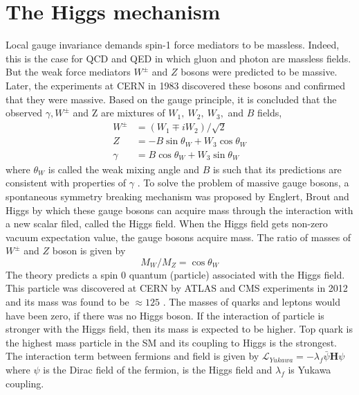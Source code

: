 \section{The Higgs mechanism}\label{sec:higgsMech}
Local gauge invariance demands spin-1 force mediators to be massless. Indeed, this is the case for QCD and QED in which gluon and photon 
are massless fields. But the weak force mediators $W^\pm$ and $Z$ bosons were predicted to be massive. Later, the experiments at CERN in 1983 
\cite{ARNISON1983103}\cite{BANNER1983476}\cite{1983398}\cite{BAGNAIA1983130} discovered these bosons and confirmed that they were massive. 
Based on the gauge principle, it is concluded that the observed $\gamma, W^\pm$ and Z are mixtures of $W_1,\ W_2,\ W_3,$ and $B$ fields,
\begin{align}
W^\pm & = (W_1 \mp iW_2)/\sqrt{2}\\
Z & = -B\sin\theta_W + W_3\cos\theta_W\\
\gamma &= B\cos\theta_W + W_3\sin\theta_W
\end{align}
where $\theta_W$ is called the weak mixing angle and $B$ is such that its predictions are consistent with properties of $\gamma$ 
\cite{MartinShaw}. To solve the problem of massive gauge bosons, a spontaneous symmetry breaking mechanism was proposed by Englert, Brout 
and Higgs \cite{Higgs:1964pj}\cite{Englert:1964et} by which these gauge bosons can acquire mass through the interaction with a new scalar 
filed, called the Higgs field. When the Higgs field gets non-zero vacuum expectation value, the gauge bosons acquire mass.
The ratio of masses of $W^\pm$ and $Z$ boson is given by
\begin{equation}
M_W/M_Z = \cos \theta_W
\end{equation}
The theory predicts a spin 0 quantum (particle) associated with the Higgs field. This particle was discovered at CERN by ATLAS and CMS 
experiments in 2012 \cite{Aad:2012tfa}\cite{Chatrchyan:2012xdj} and its mass was found to be $\approx 125$ \gev. The masses of quarks and 
leptons would have been zero, if there was no Higgs boson. If the interaction of particle is stronger with the Higgs field, then its mass is 
expected to be higher. Top quark is the highest mass particle in the SM and its coupling to Higgs is the strongest. The interaction term between 
fermions and \higgs field is given by $\mathcal{L}_{Yukawa} = - \lambda_f \bar{\psi}\textbf{H}\psi$ where $\psi$ is the Dirac field of the 
fermion, \textbf{\higgs} is the Higgs field and $\lambda_f$ is Yukawa coupling.

